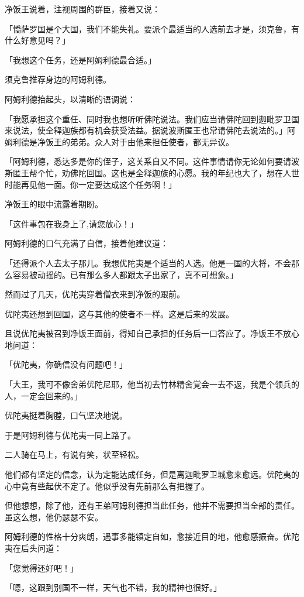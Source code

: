 \documentclass[twoside,openany]{book}
\begin{document}
净饭王说着，注视周围的群臣，接着又说：

「憍萨罗国是个大国，我们不能失礼。要派个最适当的人选前去才是，须克鲁，有什么好意见吗？」

「我想这个任务，还是阿姆利德最合适。」

须克鲁推荐身边的阿姆利德。

阿姆利德抬起头，以清晰的语调说：

「我愿承担这个重任、同时我也想听听佛陀说法。我们应当请佛陀回到迦毗罗卫国来说法，使全释迦族都有机会获受法益。据说波斯匿王也常请佛陀去说法的。」阿姆利德是净饭王的弟弟。众人对于由他来担任使者，都无异议。

「阿姆利德，悉达多是你的侄子，这关系自又不同。这件事情请你无论如何要请波斯匿王帮个忙，劝佛陀回国。这也是全释迦族的心愿。我的年纪也大了，想在人世时能再见他一面。你一定要达成这个任务啊！」

净饭王的眼中流露着期盼。

「这件事包在我身上了,请您放心！」

阿姆利德的口气充满了自信，接着他建议道：

「还得派个人去太子那儿。我想优陀夷是个适当的人选。他是一国的大将，不会那么容易被动摇的。已有那么多人都跟太子出家了，真不可想象。」

然而过了几天，优陀夷穿着僧衣来到净饭的跟前。

优陀夷还想到回国，这与其他的使者不一样。这是后来的发展。

且说优陀夷被召到净饭王面前，得知自己承担的任务后一口答应了。净饭王不放心地问道：

「优陀夷，你确信没有问题吧！」

「大王，我可不像舍弟优陀尼耶，他当初去竹林精舍覚会一去不返，我是个领兵的人，一定会回来的。」

优陀夷挺着胸膛，口气坚决地说。

于是阿姆利德与优陀夷一同上路了。

二人骑在马上，有说有笑，状至轻松。

他们都有坚定的信念，认为定能达成任务，但是离迦毗罗卫城愈来愈远。优陀夷的心中竟有些起伏不定了。他似乎没有先前那么有把握了。

但他想想，除了他，还有王弟阿姆利德担当此任务，他并不需要担当全部的责任。虽这么想，他仍瑟瑟不安。

阿姆利德的性格十分爽朗，遇事多能镇定自如，愈接近目的地，他愈感振奋。优陀夷在后头问道：

「您觉得还好吧！」

「嗯，这跟到别国不一样，天气也不错，我的精神也很好。」
\end{document}
